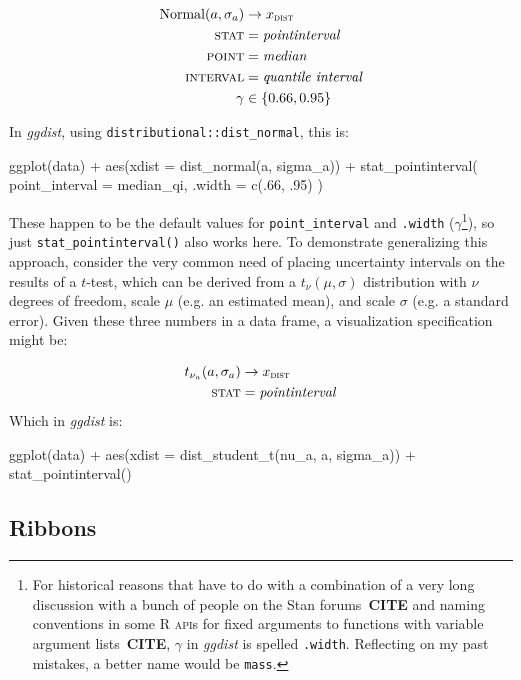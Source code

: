 \documentclass[journal]{vgtc}                     %
\newenvironment{centerverbatim}{%
  \hfill\break
  \centering
  \varwidth{\linewidth}%
  \verbatim
}{%
  \endverbatim
  \endvarwidth
  \par
  \hfill\break
}
\begin{document}
\begin{align*}
\operatorname{Normal}(a, \sigma_a) &\rightarrow x_\textsc{dist}\\
\textsc{stat} &= \mathit{pointinterval}\\
\textsc{point} &= \mathit{median}\\
\textsc{interval} &= \textit{quantile interval}\\
\gamma &\in \{0.66, 0.95\}
\end{align*}

In \textit{ggdist}, using \texttt{distributional::dist\_normal}, this is:

\begin{centerverbatim}
ggplot(data) +
  aes(xdist = dist_normal(a, sigma_a)) +
  stat_pointinterval(
    point_interval = median_qi, 
    .width = c(.66, .95)
  )
\end{centerverbatim}

These happen to be the default values for \texttt{point\_interval} and \texttt{.width} ($\gamma$\footnote{For historical reasons that have to do with a combination of a very long discussion with a bunch of people on the Stan forums~\textbf{CITE} and naming conventions in some R \textsc{api}s for fixed arguments to functions with variable argument lists~\textbf{CITE}, $\gamma$ in \textit{ggdist} is spelled \texttt{.width}. Reflecting on my past mistakes, a better name would be  \texttt{mass}.}), so just \texttt{stat\_pointinterval()}  also works here. To demonstrate generalizing this approach, consider the very common need of placing uncertainty intervals on the results of a $t$-test, which can be derived from a $t_\nu(\mu, \sigma)$  distribution with $\nu$ degrees of freedom, scale $\mu$ (e.g. an estimated mean), and scale $\sigma$ (e.g. a standard error). Given these three numbers in a data frame, a visualization specification might be:


\begin{align*}
t_{\nu_a}(a, \sigma_a) &\rightarrow x_\textsc{dist}\\
\textsc{stat} &= \mathit{pointinterval}
\end{align*}
Which in \textit{ggdist} is:

\begin{centerverbatim}
ggplot(data) +
  aes(xdist = dist_student_t(nu_a, a, sigma_a)) +
  stat_pointinterval()
\end{centerverbatim}

\subsection{Ribbons}
\end{document}
